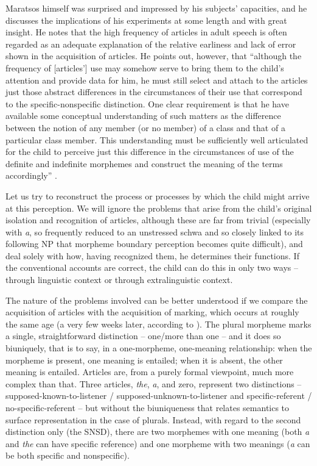 Maratsos himself was surprised and impressed by his subjects' capacities, and he discusses the implications of his experiments at
some length and with great insight. He notes that the high frequency of articles in adult speech is often regarded as an adequate explanation of the relative earliness and lack of error shown in the acquisition of articles. He points out, however, that ``although the frequency of [articles'] use may somehow serve to bring them to the child's atten\-tion and provide data for him, he must still select and attach to the articles just those abstract differences in the circumstances of their use that correspond to the specific-nonspecific distinction. One clear requirement is that he have available some conceptual understanding of such matters as the difference between the notion of any member (or no member) of a class and that of a particular class member. This understanding must be sufficiently well articulated for the child to perceive just this difference in the circumstances of use of the definite and indefinite morphemes and construct the meaning of the terms accordingly'' \citep[453]{Maratsos1974}.

Let us try to reconstruct the process or processes by which the child might arrive at this perception. We will ignore the problems that arise from the child's original isolation and recognition of articles, although these are far from trivial (especially with \textit{a}, so frequently reduced to an unstressed schwa and so closely linked to its following NP that morpheme boundary perception becomes quite difficult), and deal solely with how, having recognized them, he determines their functions.\enlargethispage{1\baselineskip} If the conventional accounts are correct, the child can do this in only two ways -- through linguistic context or through extralinguistic context.

The nature of the problems involved can be better understood if we compare the acquisition of articles  with the acquisition of  marking, which occurs at roughly the same age (a very few weeks later, according to \citealt{Brown1973}). The plural morpheme marks a single, straightforward distinction -- one/more than one -- and it does so biuniquely, that is to say, in a one-morpheme, one-meaning relationship: when the morpheme is present, one meaning is entailed; when it is absent, the other meaning is entailed. Articles are, from a purely formal viewpoint, much more complex than that. Three articles, \textit{the}, \textit{a}, and
zero, represent two distinctions -- supposed-known-to-listener / supposed-unknown-to-listener and specific-referent / no-specific-referent -- but without the biuniqueness that relates semantics to surface repre\-sentation in the case of plurals. Instead, with regard to the second distinction only (the SNSD), there are two morphemes with one meaning (both \textit{a} and \textit{the} can have specific reference) and one mor\-pheme with two meanings (\textit{a} can be both specific and nonspecific).

